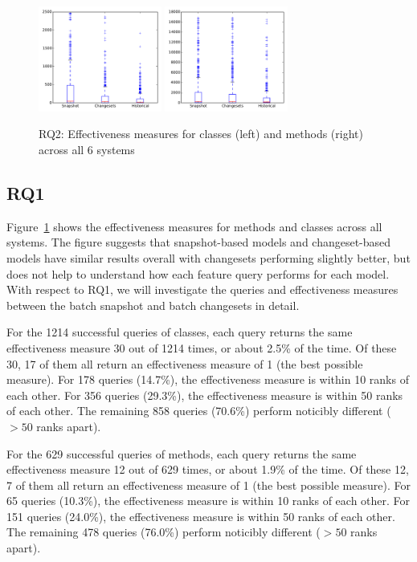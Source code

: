 \begin{figure}[t]
\centering
\includegraphics[width=0.36\textwidth]{figures/rq2-overall-class}
\includegraphics[width=0.36\textwidth]{figures/rq2-overall-method}
\caption{RQ2: Effectiveness measures for classes (left) and methods (right) across all 6 systems}
\label{fig:em}
\end{figure}

\subsection{RQ1}

Figure~\ref{fig:em} shows the effectiveness measures for methods and classes
across all systems. The figure suggests that snapshot-based models and
changeset-based models have similar results overall with changesets performing
slightly better, but does not help to understand how each feature query performs
for each model.  With respect to RQ1, we will investigate the queries and
effectiveness measures between the batch snapshot and batch changesets in
detail.


For the 1214 successful queries of classes, each query returns the same
effectiveness measure 30 out of 1214 times, or about 2.5\% of the time.  Of
these 30, 17 of them all return an effectiveness measure of 1 (the best possible
measure).  For 178 queries (14.7\%), the effectiveness measure is within 10
ranks of each other.  For 356 queries (29.3\%), the effectiveness measure is
within 50 ranks of each other.  The remaining 858 queries (70.6\%) perform
noticibly different ($> 50$ ranks apart).

For the 629 successful queries of methods, each query returns the same
effectiveness measure 12 out of 629 times, or about 1.9\% of the time.  Of these
12, 7 of them all return an effectiveness measure of 1 (the best possible
measure).  For 65 queries (10.3\%), the effectiveness measure is within 10 ranks
of each other.  For 151 queries (24.0\%), the effectiveness measure is within 50
ranks of each other.  The remaining 478 queries (76.0\%) perform noticibly
different ($> 50$ ranks apart).


